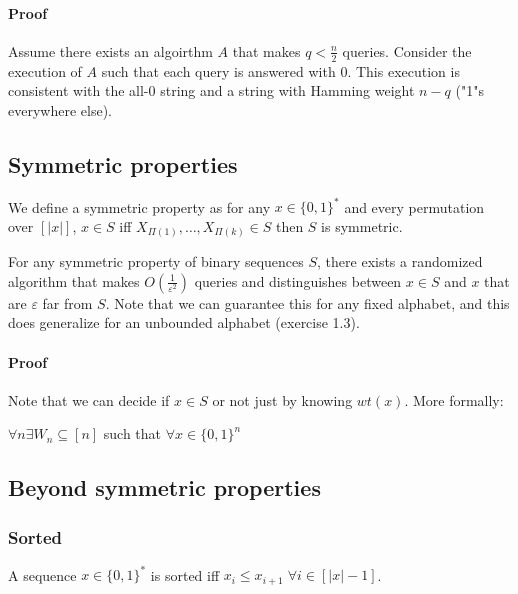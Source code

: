 \documentclass{idc_msc}
\begin{document}
\paragraph{Proof}

Assume there exists an algoirthm \(A\) that makes \(q < \frac{n}{2}\) queries. Consider the execution of \(A\) such that each query is answered with 0.
This execution is consistent with the all-0 string and a string with Hamming weight \(n - q\) ("1"s everywhere else).

\subsection{Symmetric properties}

We define a symmetric property as for any \(x \in {\{0, 1\}}^{*}\) and every permutation over \([|x|]\), \(x \in S\) iff \(X_{\Pi(1)}, \ldots, X_{\Pi(k)} \in S\) then \(S\) is symmetric.

For any symmetric property of binary sequences \(S\), there exists a randomized algorithm that makes \(O(\frac{1}{\varepsilon^2})\) queries and distinguishes between \(x \in S\) and \(x\) that are \(\varepsilon\) far from \(S\).
Note that we can guarantee this for any fixed alphabet, and this does generalize for an unbounded alphabet (exercise 1.3).

\paragraph{Proof}

Note that we can decide if \(x \in S\) or not just by knowing \(wt(x)\).
More formally:

\(\forall n \exists W_n \subseteq [n]\) such that \(\forall x \in {\{0, 1\}}^{n}\)


\subsection{Beyond symmetric properties}

\subsubsection{Sorted}

A sequence \(x \in {\{0,1\}}^{*}\) is sorted iff \(x_i \le x_{i+1} \;\forall i \in [|x|-1]\).
\end{document}
